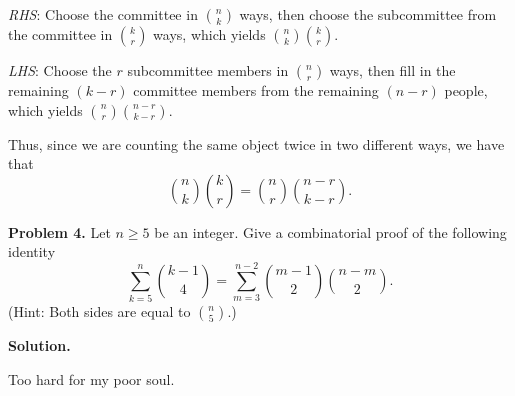 \emph{RHS}: Choose the committee in $ \binom{n}{k} $ ways,
then choose the subcommittee from the committee in $ \binom{k}{r} $ ways,
which yields $ \binom{n}{k}\binom{k}{r} $.

\emph{LHS}: Choose the $ r $ subcommittee members in $ \binom{n}{r} $ ways,
then fill in the remaining $ (k-r) $ committee members from the
remaining $ (n-r) $ people, which yields $ \binom{n}{r}\binom{n-r}{k-r} $.

Thus, since we are counting the same object twice in two different ways,
we have that
\[ \binom{n}{k}\binom{k}{r}=\binom{n}{r}\binom{n-r}{k-r}. \]

\textbf{Problem 4.} Let $ n\geqslant 5 $ be an integer. Give a combinatorial
proof of the following identity
\[ \sum\limits_{k=5}^{n} \binom{k-1}{4} = \sum\limits_{m=3}^{n-2} \binom{m-1}{2}
    \binom{n-m}{2}. \]
(Hint: Both sides are equal to $ \binom{n}{5} $.)

\textbf{Solution.}

Too hard for my poor soul.
